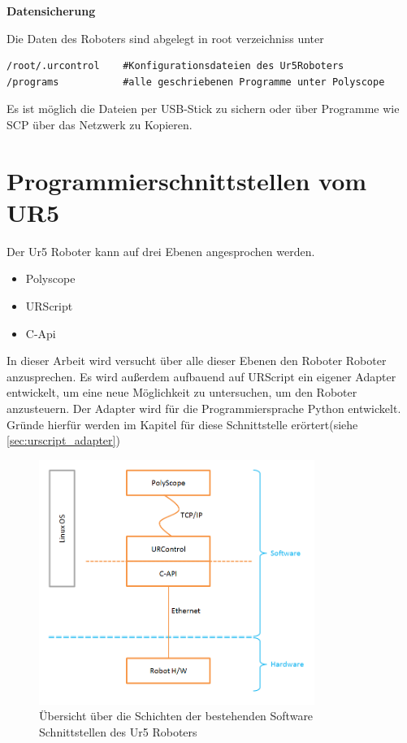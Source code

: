 \textbf{Datensicherung}

Die Daten des Roboters sind abgelegt in root verzeichniss unter 

\begin{lstlisting}[caption={Pfade Der UR5 Relevanten Dateien}, label=lst:ur5data ,captionpos=b] 
/root/.urcontrol    #Konfigurationsdateien des Ur5Roboters
/programs   		#alle geschriebenen Programme unter Polyscope
\end{lstlisting}

Es ist möglich die Dateien per USB-Stick zu sichern oder über Programme wie \ac{SCP} über das Netzwerk zu Kopieren.

\section{Programmierschnittstellen vom UR5}
\label{sec:programm_api_uebersicht_gru}

Der Ur5 Roboter kann auf drei Ebenen angesprochen werden.\\

\begin{itemize}
\item Polyscope
\item URScript
\item C-Api
\end{itemize}

In dieser Arbeit wird versucht über alle dieser Ebenen den Roboter Roboter anzusprechen.
Es wird außerdem aufbauend auf URScript ein eigener Adapter entwickelt, um eine neue Möglichkeit zu untersuchen, um den Roboter anzusteuern.
Der Adapter wird für die Programmiersprache Python entwickelt. Gründe hierfür werden im Kapitel für diese Schnittstelle erörtert(siehe \ref{sec:urscript_adapter})

\begin{figure}[H]
  \centering
    \includegraphics[width=0.8\textwidth]{pic/ur_programming_levels.png}
      \caption[Schichten der Software Schnittstellen]{Übersicht über die
      Schichten der bestehenden Software Schnittstellen des Ur5 Roboters}
      \label{fig:schnittstellen_schichten}
\end{figure}


